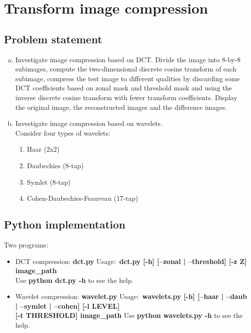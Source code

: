 \chapter{Transform image compression}

\section{Problem statement}

\begin{enumerate}[(a)]
    \item Investigate image compression based on DCT.
          Divide the image into 8-by-8 subimages, compute the two-dimensional discrete cosine
          transform of each subimage, compress the test image to different qualities by
          discarding some DCT coefficients based on zonal mask
          and threshold mask and using the inverse discrete cosine
          transform with fewer transform coefficients. Display the
          original image, the reconstructed images and the
          difference images.

    \item Investigate image compression based on wavelets. \\
          Consider four types of wavelets:
          \begin{enumerate}
            \item Haar (2x2)
            \item Daubechies (8-tap)
            \item Symlet (8-tap)
            \item Cohen-Daubechies-Feauveau (17-tap)
          \end{enumerate}
\end{enumerate}

\section{Python implementation}
\bigskip
Two programs: \\
\begin{itemize}

    \item DCT compression: \textbf{dct.py}
    Usage:~\textbf{dct.py [-h] [--zonal | --threshold] [-z Z] image\_path} \\
    Use \textbf{python dct.py -h} to see the help.

    \bigskip

    \item Wavelet compression: \textbf{wavelet.py}
    Usage:~\textbf{wavelets.py [-h] [--haar | --daub | --symlet | --cohen] [-l LEVEL]}\\
                   \textbf{[-t THRESHOLD] image\_path}
    Use \textbf{python wavelets.py -h} to see the help.

\end{itemize}

